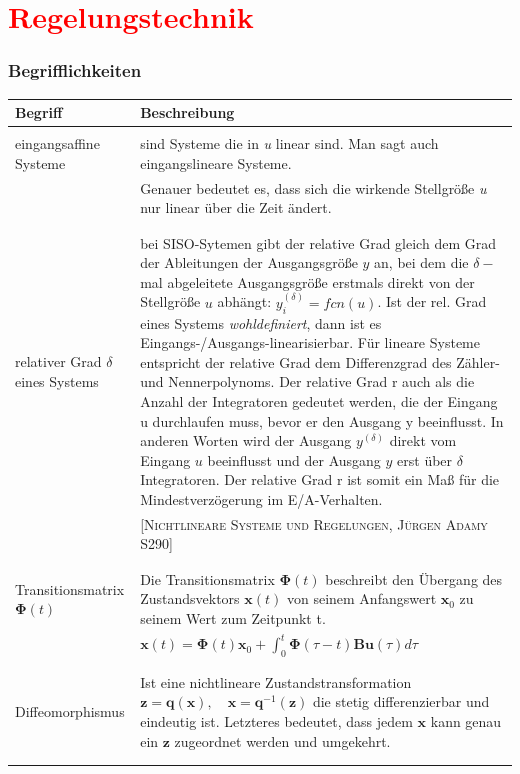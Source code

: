 \part{\textcolor{red}{Regelungstechnik}}
\section{Begrifflichkeiten}
	\begin{center}
		\begin{tabular}{l|p{12cm}}
			\textbf{Begriff} & \textbf{Beschreibung} 
			\\\hline & \\
			eingangsaffine Systeme & sind Systeme die in \textit{u} linear sind. Man sagt auch 		eingangslineare Systeme. \\& Genauer bedeutet es, dass sich die wirkende Stellgröße \textit{u} nur linear über die Zeit ändert.
			\\ & \\ \hline & \\
			relativer Grad $ \delta $ eines Systems & bei SISO-Sytemen gibt der relative Grad gleich dem Grad der Ableitungen der Ausgangsgröße $ y $ an, bei dem die $ \delta-$mal abgeleitete Ausgangsgröße erstmals direkt von der Stellgröße $ u $ abhängt: $ y^{(\delta)}_{i}=fcn(u) $. Ist der rel. Grad eines Systems \textit{wohldefiniert}, dann ist es Eingangs-/Ausgangs-linearisierbar. Für lineare Systeme entspricht der relative Grad dem Differenzgrad des Zähler- und Nennerpolynoms.  Der
			relative Grad r auch als die Anzahl der Integratoren gedeutet werden, die der Eingang u
			durchlaufen muss, bevor er den Ausgang y beeinflusst. In anderen Worten wird der Ausgang $ y^{(\delta)} $ direkt vom Eingang $ u $ beeinflusst und der Ausgang $ y $ erst über $ \delta $ Integratoren. Der relative Grad r ist somit ein Maß
			für die Mindestverzögerung im E/A-Verhalten.\\& [\textsc{Nichtlineare Systeme und Regelungen, Jürgen Adamy S290}]
			\\ & \\ \hline & \\
			Transitionsmatrix $ \bm{\Phi}(t) \label{transitionsmatrix} $& Die Transitionsmatrix  $ \bm{\Phi}(t) $ beschreibt den Übergang des Zustandsvektors $ \bm{x}(t) $	von seinem Anfangswert $ \bm{x}_{0} $ zu seinem Wert zum Zeitpunkt t.\\ & $\bm{x}(t) = \bm{\Phi}(t)\bm{x}_{0} +\int_{0}^{t}\bm{\Phi}(\tau -t)\bm{Bu}(\tau)d\tau $
			\\ & \\ \hline & \\
			Diffeomorphismus \label{diffeomorphismus} & Ist eine nichtlineare Zustandstransformation $ \bm{z} = \bm{q}(\bm{x}), \quad \bm{x} = \bm{q}^{-1}(\bm{z}) $ die stetig differenzierbar und eindeutig ist. Letzteres bedeutet, dass jedem $ \bm{x} $ kann genau ein $ \bm{z} $ zugeordnet werden und umgekehrt.
			\\ & \\ \hline & \\
			
			
			
		\end{tabular}
	\end{center}
